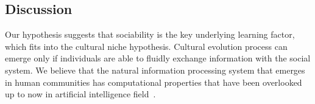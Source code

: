 \documentclass[a0,portrait]{a0poster}
\begin{document}
\begin{multicols}{2}

\vspace{-1cm}
\section*{Discussion}

Our hypothesis suggests that sociability is the key underlying learning factor, which fits into the cultural niche hypothesis.
Cultural evolution process can emerge only if individuals are able to fluidly exchange information with the social system.
We believe that the natural information processing system that emerges in human communities has computational properties that have been overlooked up to now in artificial intelligence field~\cite{gershman2015-computationalRationality}.

{ \footnotesize
}

\end{multicols}
\end{document}
